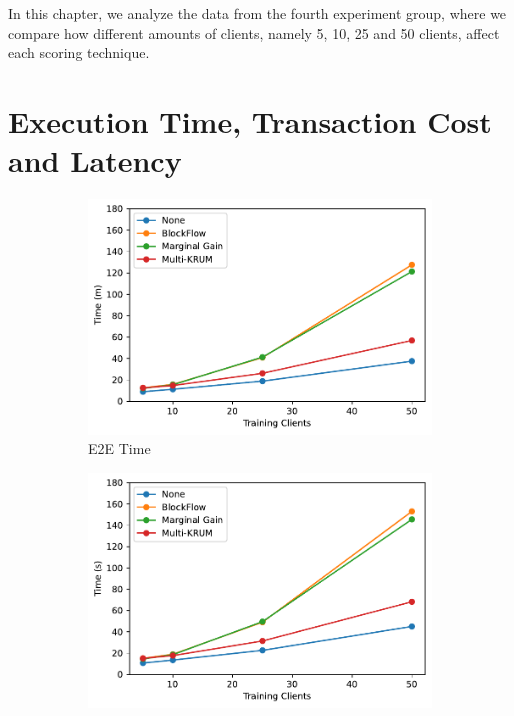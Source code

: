 In this chapter, we analyze the data from the fourth experiment group, where we compare how different amounts of clients, namely 5, 10, 25 and 50 clients, affect each scoring technique.

\section{Execution Time, Transaction Cost and Latency}

\begin{figure}[!ht]
    \centering
    \begin{subfigure}[b]{0.49\textwidth}
        \centering
        \includegraphics[width=\textwidth]{graphics/clients/e2e.pdf}
        \caption{E2E Time}
    \end{subfigure}
    \hfill
    \begin{subfigure}[b]{0.49\textwidth}
        \centering
        \includegraphics[width=\textwidth]{graphics/clients/round.pdf}

\end{subfigure}
\end{figure}
